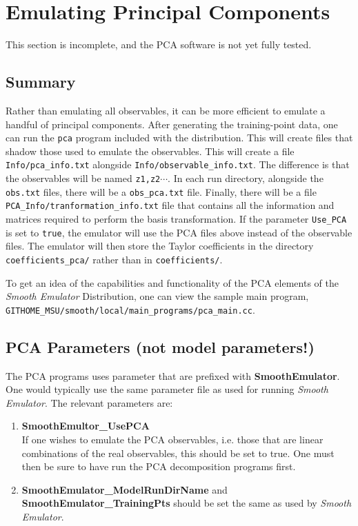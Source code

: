 \documentclass[UserManual.tex]{subfiles}
\begin{document}
\setcounter{section}{5}
\section{Emulating Principal Components}\label{sec:pca}

This section is incomplete, and the PCA software is not yet fully tested. 

\subsection{Summary}

Rather than emulating all observables, it can be more efficient to emulate a handful of principal components. After generating the training-point data, one can run the {\tt pca} program included with the distribution. This will create files that shadow those used to emulate the observables. This will create a file {\tt Info/pca\_info.txt} alongside {\tt Info/observable\_info.txt}. The difference is that the observables will be named {\tt z1,z2}$\cdots$. In each run directory, alongside the {\tt obs.txt} files, there will be a {\tt obs\_pca.txt} file. Finally, there will be a file {\tt PCA\_Info/tranformation\_info.txt} file that contains all the information and matrices required to perform the basis transformation. If the parameter {\tt Use\_PCA} is set to {\tt true}, the emulator will use the PCA files above instead of the observable files. The emulator will then store the Taylor coefficients in the directory {\tt coefficients\_pca/} rather than in {\tt coefficients/}. 

To get an idea of the capabilities and functionality of the PCA elements of the {\it Smooth Emulator} Distribution, one can view the sample main program,\\
{\tt GITHOME\_MSU/smooth/local/main\_programs/pca\_main.cc}. 

\subsection{PCA Parameters (not model parameters!)}
The PCA programs uses parameter that are prefixed with {\bf SmoothEmulator}. One would typically use the same parameter file as used for running {\it Smooth Emulator}. The relevant parameters are:
\begin{enumerate}\itemsep=0pt
\item {\bf SmoothEmultor\_UsePCA}\\
If one wishes to emulate the PCA observables, i.e. those that are linear combinations of the real observables, this should be set to true. One must then be sure to have run the PCA decomposition programs first. 
\item {\bf SmoothEmulator\_ModelRunDirName} and {\bf SmoothEmulator\_TrainingPts} should be set the same as used by {\it Smooth Emulator}.
\end{enumerate}
\end{document}

